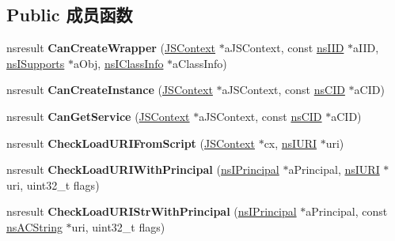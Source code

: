 \subsection*{Public 成员函数}
\begin{DoxyCompactItemize}
\item 
\mbox{\label{interfacens_i_script_security_manager_a8bc1aea744311ab61151946191159911}} 
nsresult {\bfseries Can\+Create\+Wrapper} (\hyperlink{interfacevoid}{J\+S\+Context} $\ast$a\+J\+S\+Context, const \hyperlink{struct___i_i_d}{ns\+I\+ID} $\ast$a\+I\+ID, \hyperlink{interfacens_i_supports}{ns\+I\+Supports} $\ast$a\+Obj, \hyperlink{interfacens_i_supports}{ns\+I\+Class\+Info} $\ast$a\+Class\+Info)
\item 
\mbox{\label{interfacens_i_script_security_manager_a6758eeb18b36d1ad46b5cc2b46cb7c0c}} 
nsresult {\bfseries Can\+Create\+Instance} (\hyperlink{interfacevoid}{J\+S\+Context} $\ast$a\+J\+S\+Context, const \hyperlink{struct___i_i_d}{ns\+C\+ID} $\ast$a\+C\+ID)
\item 
\mbox{\label{interfacens_i_script_security_manager_afe8522f8da77250fc9c91593be3c1240}} 
nsresult {\bfseries Can\+Get\+Service} (\hyperlink{interfacevoid}{J\+S\+Context} $\ast$a\+J\+S\+Context, const \hyperlink{struct___i_i_d}{ns\+C\+ID} $\ast$a\+C\+ID)
\item 
\mbox{\label{interfacens_i_script_security_manager_a148dd7b70b323fe922a709e6c544c75b}} 
nsresult {\bfseries Check\+Load\+U\+R\+I\+From\+Script} (\hyperlink{interfacevoid}{J\+S\+Context} $\ast$cx, \hyperlink{interfacens_i_u_r_i}{ns\+I\+U\+RI} $\ast$uri)
\item 
\mbox{\label{interfacens_i_script_security_manager_a34849a7a851d8d6f4d42f4f79abb989e}} 
nsresult {\bfseries Check\+Load\+U\+R\+I\+With\+Principal} (\hyperlink{interfacens_i_supports}{ns\+I\+Principal} $\ast$a\+Principal, \hyperlink{interfacens_i_u_r_i}{ns\+I\+U\+RI} $\ast$uri, uint32\+\_\+t flags)
\item 
\mbox{\label{interfacens_i_script_security_manager_a53dbcf5222b0f1a62225bea231f574c4}} 
nsresult {\bfseries Check\+Load\+U\+R\+I\+Str\+With\+Principal} (\hyperlink{interfacens_i_supports}{ns\+I\+Principal} $\ast$a\+Principal, const \hyperlink{structns_c_string_container}{ns\+A\+C\+String} $\ast$uri, uint32\+\_\+t flags)

\end{DoxyCompactItemize}
